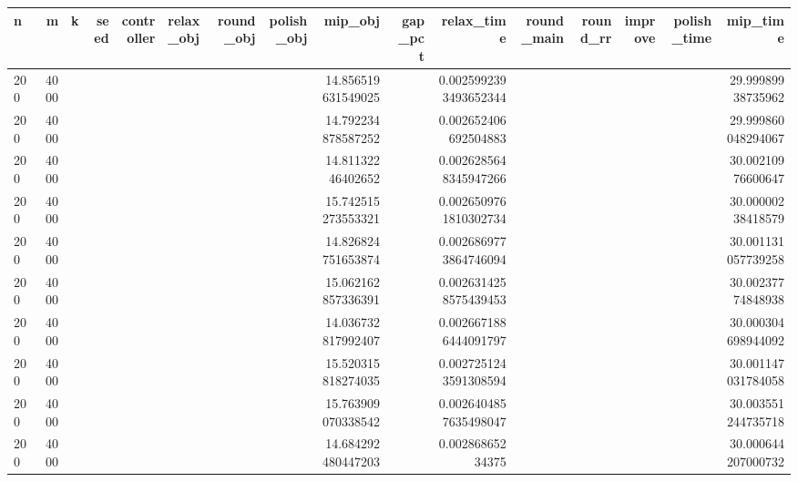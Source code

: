 \begin{tabular}{lrrrrlrrrrrrrrrr}
\hline
n & m & k & seed & controller & relax_obj & round_obj & polish_obj & mip_obj & gap_pct & relax_time & round_main & round_rr & improve & polish_time & mip_time \\ \hline
200 & 4000 &  &  &  &  &  &  & 14.856519631549025 &  & 0.0025992393493652344 &  &  &  &  & 29.99989938735962 \\
200 & 4000 &  &  &  &  &  &  & 14.792234878587252 &  & 0.002652406692504883 &  &  &  &  & 29.999860048294067 \\
200 & 4000 &  &  &  &  &  &  & 14.81132246402652 &  & 0.0026285648345947266 &  &  &  &  & 30.00210976600647 \\
200 & 4000 &  &  &  &  &  &  & 15.742515273553321 &  & 0.0026509761810302734 &  &  &  &  & 30.00000238418579 \\
200 & 4000 &  &  &  &  &  &  & 14.826824751653874 &  & 0.0026869773864746094 &  &  &  &  & 30.001131057739258 \\
200 & 4000 &  &  &  &  &  &  & 15.062162857336391 &  & 0.0026314258575439453 &  &  &  &  & 30.00237774848938 \\
200 & 4000 &  &  &  &  &  &  & 14.036732817992407 &  & 0.0026671886444091797 &  &  &  &  & 30.000304698944092 \\
200 & 4000 &  &  &  &  &  &  & 15.520315818274035 &  & 0.0027251243591308594 &  &  &  &  & 30.001147031784058 \\
200 & 4000 &  &  &  &  &  &  & 15.763909070338542 &  & 0.0026404857635498047 &  &  &  &  & 30.003551244735718 \\
200 & 4000 &  &  &  &  &  &  & 14.684292480447203 &  & 0.00286865234375 &  &  &  &  & 30.000644207000732 \\
\hline
\end{tabular}
